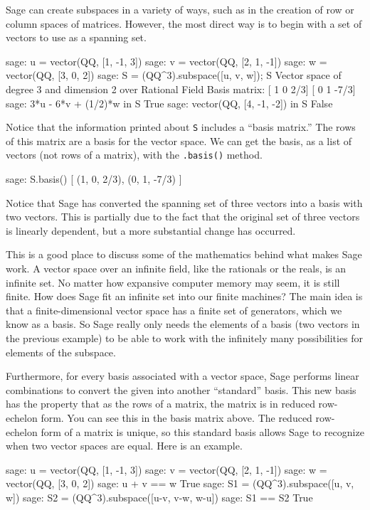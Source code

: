 %
%
Sage can create subspaces in a variety of ways, such as in the creation of row or column spaces of matrices.  However, the most direct way is to begin with a set of vectors to use as a spanning set.
%
\begin{sageexample}
sage: u = vector(QQ, [1, -1, 3])
sage: v = vector(QQ, [2, 1, -1])
sage: w = vector(QQ, [3, 0, 2])
sage: S = (QQ^3).subspace([u, v, w]); S
Vector space of degree 3 and dimension 2 over Rational Field
Basis matrix:
[   1    0  2/3]
[   0    1 -7/3]
sage: 3*u - 6*v + (1/2)*w in S
True
sage: vector(QQ, [4, -1, -2]) in S
False
\end{sageexample}
%
Notice that the information printed about \verb?S? includes a ``basis matrix.''  The rows of this matrix are a basis for the vector space.  We can get the basis, as a list of vectors (not rows of a matrix), with the \verb?.basis()? method.
%
\begin{sageexample}
sage: S.basis()
[
(1, 0, 2/3),
(0, 1, -7/3)
]
\end{sageexample}
%
Notice that Sage has converted the spanning set of three vectors into a basis with two vectors.  This is partially due to the fact that the original set of three vectors is linearly dependent, but a more substantial change has occurred.\par
%
This is a good place to discuss some of the mathematics behind what makes Sage work.  A vector space over an infinite field, like the rationals or the reals, is an infinite set.  No matter how expansive computer memory may seem, it is still finite.  How does Sage fit an infinite set into our finite machines?  The main idea is that a finite-dimensional vector space has a finite set of generators, which we know as a basis.  So Sage really only needs the elements of a basis (two vectors in the previous example) to be able to work with the infinitely many possibilities for elements of the subspace.\par
%
Furthermore, for every basis associated with a vector space, Sage performs linear combinations to convert the given into another ``standard'' basis.  This new basis has the property that as the rows of a matrix, the matrix is in reduced row-echelon form.  You can see this in the basis matrix above.  The reduced row-echelon form of a matrix is unique, so this standard basis allows Sage to recognize when two vector spaces are equal.  Here is an example.
%
\begin{sageexample}
sage: u = vector(QQ, [1, -1,  3])
sage: v = vector(QQ, [2,  1, -1])
sage: w = vector(QQ, [3,  0,  2])
sage: u + v == w
True
sage: S1 = (QQ^3).subspace([u, v, w])
sage: S2 = (QQ^3).subspace([u-v, v-w, w-u])
sage: S1 == S2
True
\end{sageexample}
